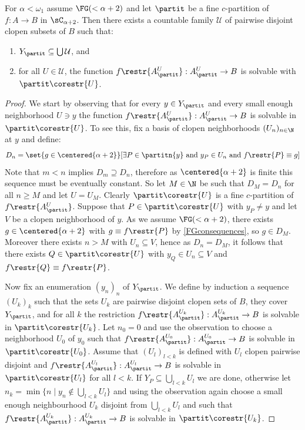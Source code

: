 \begin{theorem}\label{SolvableDecomposition}
For $\alpha<\omega_1$ assume $\FG(<\alpha+2)$ and let $\partit$ be a fine $c$-partition of $f:A \to B$ in $\sC_{\alpha+2}$.
Then there exists a countable family $\mathcal{U}$ of pairwise disjoint clopen subsets of $B$ such that:
\begin{enumerate}
\item $Y_\partit \subseteq \bigcup \mathcal{U}$, and 
\item for all $U\in \mathcal{U}$, the function $f\restr{A^U_\partit}:A^U_\partit\to B$ is solvable with $\partit\corestr{U}$.
\end{enumerate}
\end{theorem}
\begin{proof}
We start by observing that for every $y\in Y_\partit$ and every small enough neighborhood $U\ni y$ the function $f\restr{A^U_\partit}:A^U_\partit\to B$ is solvable in $\partit\corestr{U}$. 
To see this, fix a basis of clopen neighborhoods $(U_n)_{n\in \N}$ at $y$ and define:
\[
D_n=\set{g\in \centered{\alpha+2}}[\exists P\in\partitn{y} \text{ and } y_P\in U_n \text{ and } f\restr{P}\equiv g]
\]
Note that $m<n$ implies $D_m\supseteq D_n$, therefore as $\centered{\alpha+2}$ is finite this sequence must be eventually constant. So let $M\in\N$ be such that $D_M=D_n$ for all $n\geq M$ and let $U=U_M$. 
Clearly $\partit\corestr{U}$ is a fine $c$-partition of $f\restr{A^U_\partit}$. Suppose that $P\in \partit\corestr{U}$ with $y_P\neq y$ and let $V$ be a clopen neighborhood of $y$. As we assume $\FG(<\alpha+2)$, there exists $g\in \centered{\alpha+2}$ with $g\equiv f\restr{P}$ by \cref{FGconsequences}, so $g\in D_M$. Moreover there exists $n>M$ with $U_n\subseteq V$, hence as $D_n=D_M$, it follows that there exists $Q\in\partit\corestr{U}$ with $y_Q\in U_n\subseteq V$ and $f\restr{Q}\equiv f\restr{P}$.

Now fix an enumeration $(y_n)_n$ of $Y_\partit$. We define by induction a sequence $(U_k)_k$ such that the sets $U_k$ are pairwise disjoint clopen sets of $B$,
they cover $Y_\partit$, and for all $k$ the restriction $f\restr{A^{U_k}_\partit}:A^{U_k}_\partit\to B$ is solvable in $\partit\corestr{U_k}$.
Let $n_0=0$ and use the observation to choose a neighborhood $U_0$ of $y_0$ such that $f\restr{A^{U_0}_\partit}:A^{U_0}_\partit\to B$ is solvable in $\partit\corestr{U_0}$. Assume that $(U_l)_{l<k}$ is defined with $U_l$ clopen pairwise disjoint and $f\restr{A^{U_l}_\partit}:A^{U_l}_\partit\to B$ is solvable in $\partit\corestr{U_l}$ for all $l<k$. If $Y_P\subseteq \bigcup_{l<k}U_l$ we are done, otherwise let $n_k=\min \{n\mid y_n\notin  \bigcup_{l<k}U_l\}$
and using the observation again choose a small enough neighbourhood $U_k$ disjoint from $\bigcup_{l<k}U_l$ and such that $f\restr{A^{U_k}_\partit}:A^{U_k}_\partit\to B$ is solvable in $\partit\corestr{U_k}$. 
\end{proof}


